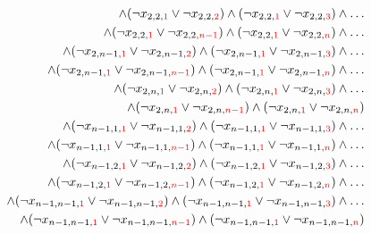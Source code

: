 \documentclass[11pt, a4paper]{article}
\begin{document}
\begin{align*}
	\wedge
	(\neg x_{2,2,{\color{red} 1}} \vee \neg x_{2,2,{\color{red} 2}}) 
	\wedge 
	(\neg x_{2,2,{\color{red} 1}} \vee \neg x_{2,2,{\color{red} 3}})
	\wedge \dots \\
	\wedge
	(\neg x_{2,2,{\color{red} 1}} \vee \neg x_{2,2,{\color{red} n-1}})
	\wedge
	(\neg x_{2,2,{\color{red} 1}} \vee \neg x_{2,2,{\color{red} n}})
	\wedge \dots \\
	\wedge
	(\neg x_{2,n-1,{\color{red} 1}} \vee \neg x_{2,n-1,{\color{red} 2}}) 
	\wedge 
	(\neg x_{2,n-1,{\color{red} 1}} \vee \neg x_{2,n-1,{\color{red} 3}})
	\wedge \dots \\
	\wedge
	(\neg x_{2,n-1,{\color{red} 1}} \vee \neg x_{2,n-1,{\color{red} n-1}})
	\wedge
	(\neg x_{2,n-1,{\color{red} 1}} \vee \neg x_{2,n-1,{\color{red} n}})
	\wedge \dots \\
	\wedge
	(\neg x_{2,n,{\color{red} 1}} \vee \neg x_{2,n,{\color{red} 2}}) 
	\wedge 
	(\neg x_{2,n,{\color{red} 1}} \vee \neg x_{2,n,{\color{red} 3}})
	\wedge \dots \\
	\wedge
	(\neg x_{2,n,{\color{red} 1}} \vee \neg x_{2,n,{\color{red} n-1}})
	\wedge
	(\neg x_{2,n,{\color{red} 1}} \vee \neg x_{2,n,{\color{red} n}})
	\\
	\wedge (\neg x_{n-1,1,{\color{red} 1}} \vee \neg x_{n-1,1,{\color{red} 2}}) 
	\wedge 
	(\neg x_{n-1,1,{\color{red} 1}} \vee \neg x_{n-1,1,{\color{red} 3}})
	\wedge \dots \\
	\wedge
	(\neg x_{n-1,1,{\color{red} 1}} \vee \neg x_{n-1,1,{\color{red} n-1}})
	\wedge
	(\neg x_{n-1,1,{\color{red} 1}} \vee \neg x_{n-1,1,{\color{red} n}})
	\wedge \dots \\
	\wedge
	(\neg x_{n-1,2,{\color{red} 1}} \vee \neg x_{n-1,2,{\color{red} 2}}) 
	\wedge 
	(\neg x_{n-1,2,{\color{red} 1}} \vee \neg x_{n-1,2,{\color{red} 3}})
	\wedge \dots \\
	\wedge
	(\neg x_{n-1,2,{\color{red} 1}} \vee \neg x_{n-1,2,{\color{red} n-1}})
	\wedge
	(\neg x_{n-1,2,{\color{red} 1}} \vee \neg x_{n-1,2,{\color{red} n}})
	\wedge \dots \\
	\wedge
	(\neg x_{n-1,n-1,{\color{red} 1}} \vee \neg x_{n-1,n-1,{\color{red} 2}}) 
	\wedge 
	(\neg x_{n-1,n-1,{\color{red} 1}} \vee \neg x_{n-1,n-1,{\color{red} 3}})
	\wedge \dots \\
	\wedge
	(\neg x_{n-1,n-1,{\color{red} 1}} \vee \neg x_{n-1,n-1,{\color{red} n-1}})
	\wedge
	(\neg x_{n-1,n-1,{\color{red} 1}} \vee \neg x_{n-1,n-1,{\color{red} n}})

\end{align*}
\end{document}
